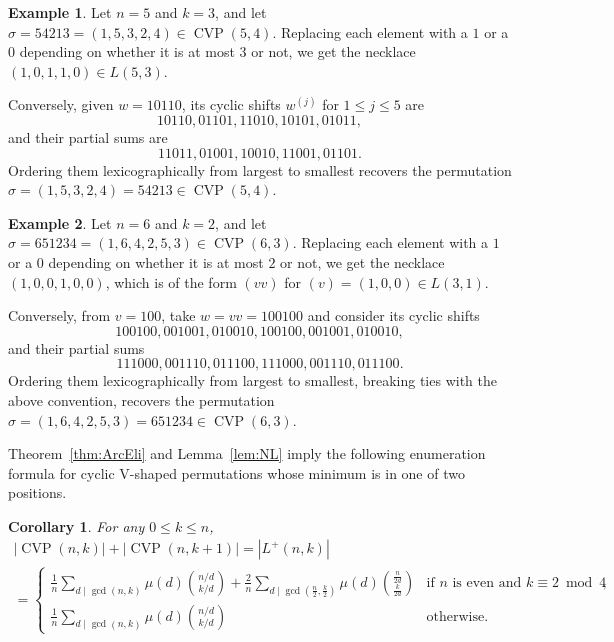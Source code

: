 \documentclass[12pt]{article}
\DeclareMathOperator{\CVP}{CVP}
\newcommand{\card}[1]{\left|#1\right|}
\newtheorem{corollary}[theorem]{Corollary}
\theoremstyle{definition}
\newtheorem{example}{Example}
\begin{document}
\begin{example}
    Let $n=5$ and $k=3$, and let $\sigma=54213=(1,5,3,2,4)\in\CVP(5,4)$. Replacing each element with a $1$ or a $0$ depending on whether it is at most $3$ or not, we get the necklace $(1,0,1,1,0)\in L(5,3)$.

    Conversely, given $w=10110$, its cyclic shifts $w^{(j)}$ for $1\le j\le 5$ are 
    $$10110,01101,11010,10101,01011,$$
    and their partial sums are 
    $$11011,01001,10010,11001,01101.$$
    Ordering them lexicographically from largest to smallest recovers the permutation $\sigma=(1,5,3,2,4)=54213\in\CVP(5,4)$.
\end{example}

\begin{example}
    Let $n=6$ and $k=2$, and let $\sigma=651234=(1,6,4,2,5,3)\in\CVP(6,3)$. Replacing each element with a $1$ or a $0$ depending on whether it is at most $2$ or not, we get the necklace $(1,0,0,1,0,0)$, which is of the form $(vv)$ for $(v)=(1,0,0)\in L(3,1)$.

    Conversely, from $v=100$, take $w=vv=100100$ and consider its cyclic shifts
    $$100100,001001,010010,100100,001001,010010,$$
    and their partial sums 
    $$111000,001110,011100,111000,001110,011100.$$
    Ordering them lexicographically from largest to smallest, breaking ties with the above convention, recovers the permutation $\sigma=(1,6,4,2,5,3)=651234\in\CVP(6,3)$.
\end{example}

Theorem~\ref{thm:ArcEli} and Lemma~\ref{lem:NL} imply the following enumeration formula for cyclic V-shaped permutations whose minimum is in one of two positions.

\begin{corollary}\label{cor:CVP-formula}
    For any $0\le k\le n$, 
\begin{multline*}
    \card{\CVP(n,k)}+\card{\CVP(n,k+1)}=\card{L^+(n,k)}\\
    =\begin{cases}
    \displaystyle
    \frac{1}{n}\sum_{d\mid\gcd(n,k)}\mu(d)\binom{n/d}{k/d}+\frac{2}{n}\sum_{d\mid\gcd(\frac{n}{2},\frac{k}{2})}\mu(d)\binom{\frac{n}{2d}}{\frac{k}{2d}} & \text{if $n$ is even and $k\equiv 2\bmod 4$},\\ 
    \displaystyle
    \frac{1}{n}\sum_{d\mid\gcd(n,k)}\mu(d)\binom{n/d}{k/d} & \text{otherwise.}\end{cases}
\end{multline*}
\end{corollary}
\end{document}
